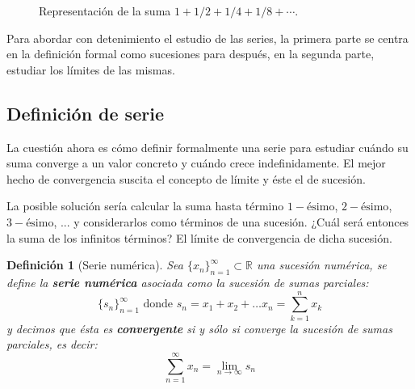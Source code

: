 \documentclass[10pt,a4paper,openright]{book}
\theoremstyle{break}
\newtheorem{defi}{Definición}[chapter]
\begin{document}
\begin{figure}[h]
	\centering
	\caption{Representación de la suma $1 + 1/2 + 1/4 + 1/8 + \cdots$.}
	\label{fig: suma inversos potencias de dos}
\end{figure}

Para abordar con detenimiento el estudio de las series, la primera parte se centra en la definición formal como sucesiones para después, en la segunda parte, estudiar los límites de las mismas.

\subsection{Definición de serie}
La cuestión ahora es cómo definir formalmente una serie para estudiar cuándo su suma converge a un valor concreto y cuándo crece indefinidamente. El mejor hecho de convergencia suscita el concepto de límite y éste el de sucesión.

La posible solución sería calcular la suma hasta término $1-\mbox{ésimo}$, $2-\mbox{ésimo}$, $3-\mbox{ésimo}$, ... y considerarlos como términos de una sucesión. ¿Cuál será entonces la suma de los infinitos términos? El límite de convergencia de dicha sucesión.

\begin{defi}[Serie numérica]
Sea $\{x_n\}_{n=1}^\infty\subset \mathbb R$ una sucesión numérica, se define la \textbf{serie numérica} asociada como la sucesión de sumas parciales:
\[
\{s_n\}_{n=1}^\infty \mbox{ donde } s_n = x_1 + x_2 + \ldots x_n = \sum_{k=1}^{n} x_k
\]
y decimos que ésta es \textbf{convergente} si y sólo si converge la sucesión de sumas parciales, es decir:
$$\sum_{n=1}^\infty x_n = \lim_{n\rightarrow\infty} s_n$$
\end{defi}
\end{document}
